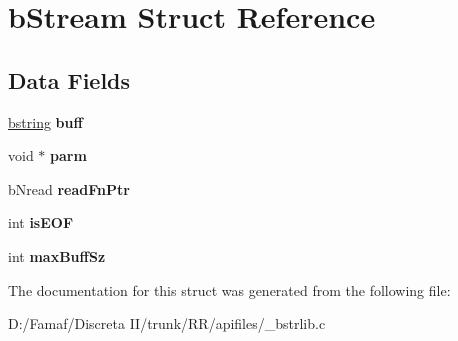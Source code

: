 \hypertarget{structb_stream}{\section{b\+Stream Struct Reference}
\label{structb_stream}
}
\subsection*{Data Fields}
\begin{DoxyCompactItemize}
\item 
\hypertarget{structb_stream_aaeb3f5ba0485a3def96e3b7f2711d0d7}{\hyperlink{structtagbstring}{bstring} {\bfseries buff}}\label{structb_stream_aaeb3f5ba0485a3def96e3b7f2711d0d7}

\item 
\hypertarget{structb_stream_a14c65b9f2783c6f6dafdaaa372329e4d}{void $\ast$ {\bfseries parm}}\label{structb_stream_a14c65b9f2783c6f6dafdaaa372329e4d}

\item 
\hypertarget{structb_stream_afb7cb946b38763bce9ed3a8fd3d464af}{b\+Nread {\bfseries read\+Fn\+Ptr}}\label{structb_stream_afb7cb946b38763bce9ed3a8fd3d464af}

\item 
\hypertarget{structb_stream_a2200d2312f0bc6a7a38c4f5a3ec7ce16}{int {\bfseries is\+E\+O\+F}}\label{structb_stream_a2200d2312f0bc6a7a38c4f5a3ec7ce16}

\item 
\hypertarget{structb_stream_a2e57f16ac56ce72908d74fc735b9b8f3}{int {\bfseries max\+Buff\+Sz}}\label{structb_stream_a2e57f16ac56ce72908d74fc735b9b8f3}

\end{DoxyCompactItemize}


The documentation for this struct was generated from the following file\+:\begin{DoxyCompactItemize}
\item 
D\+:/\+Famaf/\+Discreta I\+I/trunk/\+R\+R/apifiles/\+\_\+bstrlib.\+c\end{DoxyCompactItemize}
